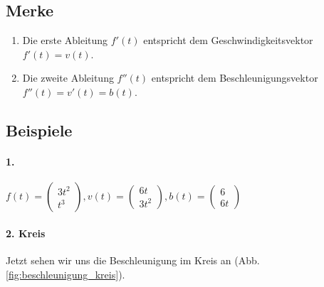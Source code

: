 \subsection{Merke}
\begin{enumerate}
\item Die erste Ableitung $f'(t)$ entspricht dem Geschwindigkeitsvektor $f'(t) = v(t)$.
\item Die zweite Ableitung $f''(t)$ entspricht dem Beschleunigungsvektor $f''(t)= v'(t)=b(t)$.
\end{enumerate}

\subsection{Beispiele}
\paragraph{1.} 
$ f(t)= \left( \begin{array}{c} 3t^2\\t^3\end{array}\right), v(t)=\left( \begin{array}{c} 6t\\3t^2 \end{array}\right), b(t)=\left( \begin{array}{c} 6\\ 6t\end{array}\right)$
\paragraph{2. Kreis} 
Jetzt sehen wir uns die Beschleunigung im Kreis an (Abb. \ref{fig:beschleunigung_kreis}).

